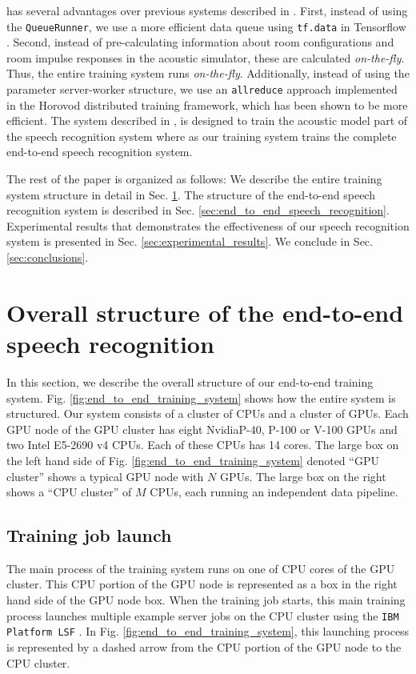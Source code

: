 \documentclass{article}
\begin{document}
has several advantages over previous systems described in
\cite{c_kim_interspeech_2018_00}. First, instead of using the {\tt QueueRunner},
we use a more efficient data queue using {\tt tf.data} in Tensorflow 
\cite{m_abadi_usenix_2016}.  Second, instead
of pre-calculating information about room configurations and 
room impulse responses in the acoustic simulator, these are
calculated {\it on-the-fly}. Thus, the entire training system runs 
{\it on-the-fly}. Additionally, instead of using the parameter server-worker
structure, we use an {\tt allreduce} approach implemented in the Horovod
\cite{a_sergeev_arxiv_2018_00} distributed training framework, which
has been shown to be more efficient. The system described in 
\cite{E_Variani_INTERSPEECH_2017_01}, is designed
to train the acoustic model part of the speech recognition system where
as our training system trains the complete end-to-end speech recognition system.

The rest of the paper is organized as follows: We describe the entire
training system structure in detail in Sec. \ref{sec:training_cpu_gpu}.
The structure of the end-to-end speech recognition system 
is described in Sec. \ref{sec:end_to_end_speech_recognition}. 
Experimental results that demonstrates the effectiveness of our speech
recognition system is presented in Sec. \ref{sec:experimental_results}. 
We conclude in Sec.  \ref{sec:conclusions}.
%
\section{Overall structure of the end-to-end speech recognition}
\label{sec:training_cpu_gpu}
\vspace{-1mm}

In this section, we describe the overall structure of our 
end-to-end training system.  Fig. \ref{fig:end_to_end_training_system}
shows how the entire system is structured. Our system consists
of a cluster of CPUs and a cluster of GPUs. Each GPU node of 
the GPU cluster has eight Nvidia\texttrademark P-40, P-100 or V-100 GPUs and two 
Intel E5-2690 v4 CPUs. Each of these CPUs has 14 cores.
The large box on the left hand side of Fig. \ref{fig:end_to_end_training_system}
denoted ``GPU cluster'' shows a typical GPU node with $N$ GPUs.
The large box on the right shows a ``CPU cluster'' of $M$ CPUs,
each running an independent data pipeline. 

\vspace{-1mm}
\subsection{Training job launch}
The main process of the training system runs on one of CPU cores 
of the GPU cluster. This CPU portion of the GPU node is represented
as a box in the right hand side of the GPU node box.
When the training job starts, this main training process launches
multiple example server jobs on the CPU cluster using the 
{\tt IBM Platform LSF} \cite{ibm_spectrum_lsf_2010}. In Fig. 
\ref{fig:end_to_end_training_system}, this launching process is represented
by a dashed arrow from the CPU portion of the GPU node to the 
CPU cluster. 
\end{document}
